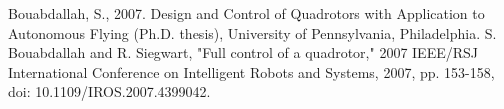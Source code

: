 \documentclass[conference]{IEEEtran}
\begin{document}
\begin{thebibliography}{00}
 Bouabdallah, S., 2007. Design and Control of Quadrotors with Application to
Autonomous Flying (Ph.D. thesis), University of Pennsylvania, Philadelphia.
 S. Bouabdallah and R. Siegwart, "Full control of a quadrotor," 2007 IEEE/RSJ International Conference on Intelligent Robots and Systems, 2007, pp. 153-158, doi: 10.1109/IROS.2007.4399042.


\end{thebibliography}
\vspace{12pt}
\end{document}
